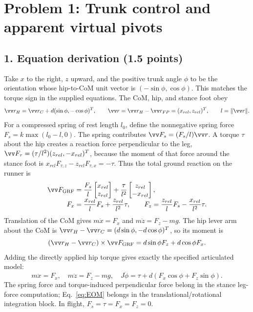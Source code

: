 \section{Problem 1: Trunk control and apparent virtual pivots}
\subsection*{1. Equation derivation (1.5 points)}
Take $x$ to the right, $z$ upward, and the positive trunk angle $\phi$ to be the orientation whose hip-to-CoM unit vector is $(-\sin\phi,\cos\phi)$. This matches the torque sign in the supplied equations. The CoM, hip, and stance foot obey
\begin{equation}
 \vv r_H = \vv r_C+d(\sin\phi,-\cos\phi)^T,\qquad
 \vv r=\vv r_H-\vv r_{FP}=(x_{rel},z_{rel})^T,\qquad
 l=\|\vv r\|.
 \label{eq:geometry}
\end{equation}
For a compressed spring of rest length $l_0$, define the nonnegative spring force $F_s=k\max(l_0-l,0)$. The spring contributes $\vv F_s=(F_s/l)\vv r$. A torque $\tau$ about the hip creates a reaction force perpendicular to the leg, $\vv F_\tau=(\tau/l^2)(z_{rel},-x_{rel})^T$, because the moment of that force around the stance foot is $x_{rel}F_{\tau,z}-z_{rel}F_{\tau,x}=-\tau$. Thus the total ground reaction on the runner is
\begin{align}
 \vv F_{\mathrm{GRF}} &=\frac{F_s}{l}\begin{bmatrix}x_{rel}\\z_{rel}\end{bmatrix}+
 \frac{\tau}{l^2}\begin{bmatrix}z_{rel}\\-x_{rel}\end{bmatrix},\label{eq:GRF}\\[-0.3em]
 F_x&=\frac{x_{rel}}{l}F_s+\frac{z_{rel}}{l^2}\tau,\qquad
 F_z=\frac{z_{rel}}{l}F_s-\frac{x_{rel}}{l^2}\tau.\label{eq:components}
\end{align}
Translation of the CoM gives $m\ddot x=F_x$ and $m\ddot z=F_z-mg$. The hip lever arm about the CoM is $\vv r_H-\vv r_C=(d\sin\phi,-d\cos\phi)^T$, so its moment is
\begin{equation}
 (\vv r_H-\vv r_C)\times\vv F_{\mathrm{GRF}}
 =d\sin\phi F_z+d\cos\phi F_x.
\end{equation}
Adding the directly applied hip torque gives exactly the specified articulated model:
\begin{equation}
\boxed{\;m\ddot x=F_x,\quad m\ddot z=F_z-mg,\quad
J\ddot\phi=\tau+d(F_x\cos\phi+F_z\sin\phi).\;}
\label{eq:EOM}
\end{equation}
The spring force and torque-induced perpendicular force belong in the stance leg-force computation; Eq.~\eqref{eq:EOM} belongs in the translational/rotational integration block. In flight, $F_s=\tau=F_x=F_z=0$.

